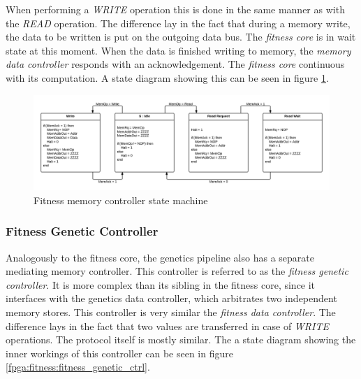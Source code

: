 When performing a \emph{WRITE} operation this is done in the same manner as with the \emph{READ} operation. The difference lay in the fact that during a memory write, the data to be written is put on the outgoing data bus. The \emph{fitness core} is in wait state at this moment. When the data is finished writing to memory, the \emph{memory data controller} responds with an acknowledgement. The \emph{fitness core} continuous with its computation.  
A state diagram showing this can be seen in figure \ref{fpga:fitness:fitness_memory_ctrl}.  



\begin{figure}[H]
\includegraphics[width=\textwidth]{fpga/fig/fitness_mem_ctrl.png}
\caption{Fitness memory controller state machine}
\label{fpga:fitness:fitness_memory_ctrl}
\end{figure}



\newpage
\subsubsection{Fitness Genetic Controller} 

Analogously to the fitness core, the genetics pipeline also has a separate mediating memory controller.
This controller is referred to as the \emph{fitness genetic controller}.
It is more complex than its sibling in the fitness core, since it interfaces with the genetics data controller, which arbitrates two independent memory stores. This controller is very similar the \emph{fitness data controller}. The difference lays in the fact that two values are transferred in case of \emph{WRITE} operations. The protocol itself is mostly similar. The a state diagram showing the inner workings of this controller can be seen in figure \ref{fpga:fitness:fitness_genetic_ctrl}. 



